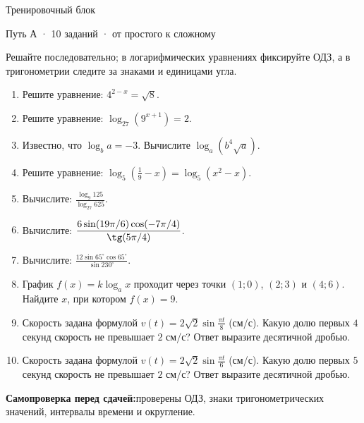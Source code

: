 \documentclass[a4paper,12pt]{article}
\begin{document}
\begin{center}
{\Large\textcolor{darkaccent}{Тренировочный блок}}\par
{\small Путь А · 10 заданий · от простого к сложному}
\end{center}
\vspace{3mm}
Решайте последовательно; в логарифмических уравнениях фиксируйте ОДЗ, а в тригонометрии следите за знаками и единицами угла.
\begin{enumerate}[label=\textcolor{darkaccent}{\textbf{\arabic*.}},itemsep=8pt]
\item Решите уравнение: $4^{2-x}=\sqrt8$.
\item Решите уравнение: $\log_{27}\left(9^{x+1}\right)=2$.
\item Известно, что $\log_b a=-3$. Вычислите $\log_a(b^4\sqrt a)$.
\item Решите уравнение:
$\displaystyle\log_5\left(\frac19-x\right)=\log_5(x^2-x)$.
\item Вычислите:
$\displaystyle\frac{\log_9 125}{\log_{27}625}$.
\item Вычислите:
$\displaystyle\frac{6\sin(19\pi/6)\cos(-7\pi/4)}{\tg(5\pi/4)}$.
\item Вычислите:
$\displaystyle\frac{12\sin65^\circ\cos65^\circ}{\sin230^\circ}$.
\item График $f(x)=k\log_a x$ проходит через точки $(1;0)$, $(2;3)$ и $(4;6)$. Найдите $x$, при котором $f(x)=9$.
\item Скорость задана формулой $\displaystyle v(t)=2\sqrt2\sin\frac{\pi t}{8}$ (см/с). Какую долю первых $4$ секунд скорость не превышает $2$ см/с? Ответ выразите десятичной дробью.
\item Скорость задана формулой $\displaystyle v(t)=2\sqrt2\sin\frac{\pi t}{6}$ (см/с). Какую долю первых $5$ секунд скорость не превышает $2$ см/с? Ответ выразите десятичной дробью.
\end{enumerate}
\vspace{4mm}
\textcolor{darkaccent}{\textbf{Самопроверка перед сдачей:}}\enspace проверены ОДЗ, знаки тригонометрических значений, интервалы времени и округление.
\clearpage
\end{document}

